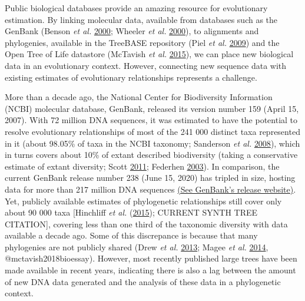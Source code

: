 \documentclass[]{article}
\begin{document}
Public biological databases provide an amazing resource for evolutionary estimation. By linking molecular data, available from databases such as the GenBank (Benson \emph{et al.} \protect\hyperlink{ref-benson2000genbank}{2000}; Wheeler \emph{et al.} \protect\hyperlink{ref-wheeler2000database}{2000}), to alignments and phylogenies, available in
the TreeBASE repository (Piel \emph{et al.} \protect\hyperlink{ref-piel2009treebase}{2009}) and the Open Tree of Life datastore (McTavish \emph{et al.} \protect\hyperlink{ref-mctavish2015phylesystem}{2015}), we can place new biological data in an evolutionary context.
However, connecting new sequence data with existing estimates of evolutionary relationships represents a challenge.

More than a decade ago, the National Center for Biodiversity Information (NCBI) molecular database, GenBank, released its version number 159 (April 15, 2007). With 72 million DNA sequences, it was estimated to have the potential to resolve evolutionary relationships of most of the 241 000 distinct taxa represented in it (about 98.05\% of taxa in the NCBI taxonomy; Sanderson \emph{et al.} \protect\hyperlink{ref-sanderson2008phylota}{2008}), which in turns covers about 10\% of extant described biodiversity (taking a conservative estimate of extant diversity; Scott \protect\hyperlink{ref-scott2011ncbi}{2011}; Federhen \protect\hyperlink{ref-federhen2003taxonomy}{2003}).
In comparison, the current GenBank release number 238 (June 15, 2020) has tripled in size, hosting data for more than 217 million DNA sequences \href{https://ftp.ncbi.nih.gov/genbank/gbrel.txt}{(See GenBank's release website)}. Yet, publicly available estimates of phylogenetic relationships still cover only about 90 000 taxa {[}Hinchliff \emph{et al.} (\protect\hyperlink{ref-hinchliff2015synthesis}{2015}); CURRENT SYNTH TREE CITATION{]}, covering less than one third of the taxonomic diversity with data available a decade ago. Some of this discrepance is because that many phylogenies are not publicly shared (Drew \emph{et al.} \protect\hyperlink{ref-drew2013lost}{2013}; Magee \emph{et al.} \protect\hyperlink{ref-magee2014dawn}{2014}, @mctavish2018bioessay). However, most recently published large trees have been made available in recent years, indicating there is also a lag between the amount of new DNA data generated and the analysis of these data in a phylogenetic context.
\end{document}
